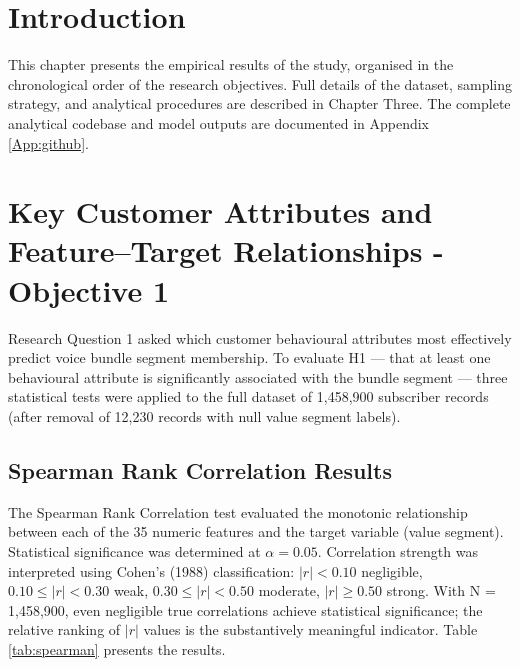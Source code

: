 
\section{Introduction}
This chapter presents the empirical results of the study, organised in the chronological order of the research objectives. Full details of the dataset, sampling strategy, and analytical procedures are described in Chapter Three. The complete analytical codebase and model outputs are documented in Appendix \ref{App:github}.

\section{Key Customer Attributes and Feature--Target Relationships - Objective 1}

Research Question 1 asked which customer behavioural attributes most effectively predict voice bundle segment membership. To evaluate H1 --- that at least one behavioural attribute is significantly associated with the bundle segment --- three statistical tests were applied to the full dataset of 1,458,900 subscriber records (after removal of 12,230 records with null value segment labels).

\subsection{Spearman Rank Correlation Results}

The Spearman Rank Correlation test evaluated the monotonic relationship between each of the 35 numeric features and the target variable (value segment). Statistical significance was determined at $\alpha = 0.05$. Correlation strength was interpreted using Cohen's (1988) classification: $|r| < 0.10$ negligible, $0.10 \leq |r| < 0.30$ weak, $0.30 \leq |r| < 0.50$ moderate, $|r| \geq 0.50$ strong. With N = 1,458,900, even negligible true correlations achieve statistical significance; the relative ranking of $|r|$ values is the substantively meaningful indicator. Table \ref{tab:spearman} presents the results.

